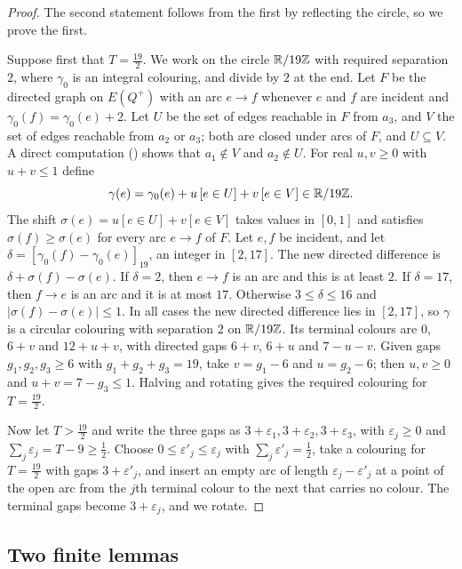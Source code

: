 \documentclass[11pt,colorlinks]{charlie}
\newcommand{\dir}[2]{[#2-#1]}
\begin{document}
\begin{proof}
The second statement follows from the first by reflecting the circle, so we prove the first.

Suppose first that $T=\frac{19}{2}$. We work on the circle $\mathbb{R}/19\mathbb{Z}$ with required separation $2$, where $\gamma_0$ is an integral colouring, and divide by $2$ at the end. Let $F$ be the directed graph on $E(Q^+)$ with an arc $e\to f$ whenever $e$ and $f$ are incident and $\gamma_0(f)=\gamma_0(e)+2$. Let $U$ be the set of edges reachable in $F$ from $a_3$, and $V$ the set of edges reachable from $a_2$ or $a_3$; both are closed under arcs of $F$, and $U\subseteq V$. A direct computation () shows that $a_1\notin V$ and $a_2\notin U$. For real $u,v\ge0$ with $u+v\le1$ define
\[
\gamma(e)=\gamma_0(e)+u\,[e\in U]+v\,[e\in V]\in\mathbb{R}/19\mathbb{Z} .
\]
The shift $\sigma(e)=u[e\in U]+v[e\in V]$ takes values in $[0,1]$ and satisfies $\sigma(f)\ge\sigma(e)$ for every arc $e\to f$ of $F$. Let $e,f$ be incident, and let $\delta=\dir{\gamma_0(e)}{\gamma_0(f)}_{19}$, an integer in $[2,17]$. The new directed difference is $\delta+\sigma(f)-\sigma(e)$. If $\delta=2$, then $e\to f$ is an arc and this is at least $2$. If $\delta=17$, then $f\to e$ is an arc and it is at most $17$. Otherwise $3\le\delta\le16$ and $|\sigma(f)-\sigma(e)|\le1$. In all cases the new directed difference lies in $[2,17]$, so $\gamma$ is a circular colouring with separation $2$ on $\mathbb{R}/19\mathbb{Z}$. Its terminal colours are $0$, $6+v$ and $12+u+v$, with directed gaps $6+v$, $6+u$ and $7-u-v$. Given gaps $g_1,g_2,g_3\ge6$ with $g_1+g_2+g_3=19$, take $v=g_1-6$ and $u=g_2-6$; then $u,v\ge0$ and $u+v=7-g_3\le1$. Halving and rotating gives the required colouring for $T=\frac{19}{2}$.

Now let $T>\frac{19}{2}$ and write the three gaps as $3+\varepsilon_1,3+\varepsilon_2,3+\varepsilon_3$, with $\varepsilon_j\ge0$ and $\sum_j\varepsilon_j=T-9\ge\frac12$. Choose $0\le\varepsilon'_j\le\varepsilon_j$ with $\sum_j\varepsilon'_j=\frac12$, take a colouring for $T=\frac{19}{2}$ with gaps $3+\varepsilon'_j$, and insert an empty arc of length $\varepsilon_j-\varepsilon'_j$ at a point of the open arc from the $j$th terminal colour to the next that carries no colour. The terminal gaps become $3+\varepsilon_j$, and we rotate.
\end{proof}

\subsection{Two finite lemmas}
\end{document}
